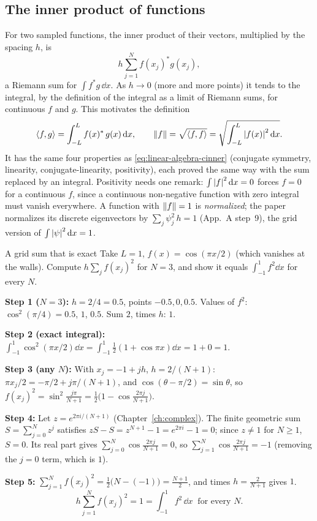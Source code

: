 \subsection{The inner product of functions}

For two sampled functions, the inner product of their vectors, multiplied by the spacing $h$, is
\[
h\sum_{j=1}^Nf(x_j)^*g(x_j),
\]
a Riemann sum for $\int f^*g\,\dd x$. As $h\to0$ (more and more points) it tends to the integral, by the definition of the integral as a limit of Riemann sums, for continuous $f$ and $g$. This motivates the definition
\begin{equation}
\langle f,g\rangle=\int_{-L}^{L}f(x)^*\,g(x)\,\mathrm{d} x,\qquad \left\lVert f\right\rVert=\sqrt{\langle f,f\rangle}=\sqrt{\int_{-L}^{L}\left\lvert f(x)\right\rvert^2\mathrm{d} x}.
\label{eq:linear-algebra-finner}
\end{equation}
It has the same four properties as \cref{eq:linear-algebra-cinner} (conjugate symmetry, linearity, conjugate-linearity, positivity), each proved the same way with the sum replaced by an integral. Positivity needs one remark: $\int\left\lvert f\right\rvert^2\mathrm{d} x=0$ forces $f=0$ for a continuous $f$, since a continuous non-negative function with zero integral must vanish everywhere. A function with $\left\lVert f\right\rVert=1$ is \emph{normalized}; the paper normalizes its discrete eigenvectors by $\sum_j\psi_j^2\,h=1$ (App.~A step~9), the grid version of $\int\left\lvert \psi\right\rvert^2\mathrm{d} x=1$.

\begin{sample}{A grid sum that is exact}
Take $L=1$, $f(x)=\cos(\pi x/2)$ (which vanishes at the walls). Compute $h\sum_jf(x_j)^2$ for $N=3$, and show it equals $\int_{-1}^1f^2\dd x$ for every $N$.

\textbf{Step 1 ($N=3$):} $h=2/4=0.5$, points $-0.5,0,0.5$. Values of $f^2$: $\cos^2(\pi/4)=0.5$, $1$, $0.5$. Sum $2$, times $h$: $1$.

\textbf{Step 2 (exact integral):} $\int_{-1}^1\cos^2(\pi x/2)\dd x=\int_{-1}^1\tfrac12(1+\cos\pi x)\dd x=1+0=1$.

\textbf{Step 3 (any $N$):} With $x_j=-1+jh$, $h=2/(N+1)$: $\pi x_j/2=-\pi/2+j\pi/(N+1)$, and $\cos(\theta-\pi/2)=\sin\theta$, so $f(x_j)^2=\sin^2\frac{j\pi}{N+1}=\frac12\big(1-\cos\frac{2\pi j}{N+1}\big)$.

\textbf{Step 4:} Let $z=e^{2\pi i/(N+1)}$ (Chapter~\ref{ch:complex}). The finite geometric sum $S=\sum_{j=0}^Nz^j$ satisfies $zS-S=z^{N+1}-1=e^{2\pi i}-1=0$; since $z\ne1$ for $N\ge1$, $S=0$. Its real part gives $\sum_{j=0}^N\cos\frac{2\pi j}{N+1}=0$, so $\sum_{j=1}^N\cos\frac{2\pi j}{N+1}=-1$ (removing the $j=0$ term, which is $1$).

\textbf{Step 5:} $\sum_{j=1}^N f(x_j)^2=\frac12\big(N-(-1)\big)=\frac{N+1}2$, and times $h=\frac2{N+1}$ gives $1$.
\[
\boxed{h\sum_{j=1}^Nf(x_j)^2=1=\int_{-1}^1f^2\,\dd x\ \text{ for every } N.}
\]
\end{sample}

